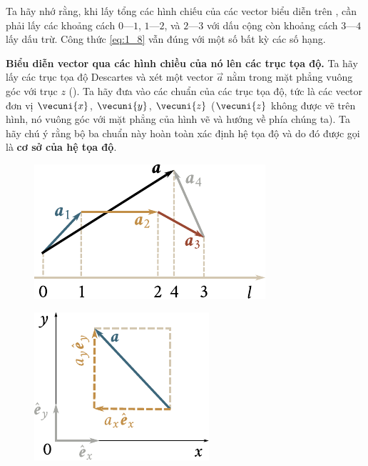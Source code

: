 \noindent
Ta hãy nhớ rằng, khi lấy tổng các hình chiếu của các vector biểu diễn trên , cần phải lấy các khoảng cách $0$---$1$, $1$---$2$, và $2$---$3$ với dấu cộng còn khoảng cách $3$---$4$ lấy dấu trừ. Công thức \eqref{eq:1_8} vẫn đúng với một số bất kỳ các số hạng.

\textbf{Biểu diễn vector qua các hình chiều của nó lên các trục tọa độ.} Ta hãy lấy các trục tọa độ Descartes và xét một vector $\vec{a}$ nằm trong mặt phẳng vuông góc với trục $z$ (). Ta hãy đưa vào các chuẩn của các trục tọa độ, tức là các vector đơn vị $\vecuni{x}$, $\vecuni{y}$, $\vecuni{z}$ ($\vecuni{z}$ không được vẽ trên hình, nó vuông góc với mặt phẳng của hình vẽ và hướng về phía chúng ta). Ta hãy chú ý rằng bộ ba chuẩn này hoàn toàn xác định hệ tọa độ và do đó được gọi là \textbf{cơ sở của hệ tọa độ}.

\begin{figure}[!htb]
	\begin{minipage}[t]{0.5\linewidth}
		\begin{center}
			\includegraphics[scale=1]{figures/ch_01/fig_1_11.pdf}
			\caption[]{}
			\label{fig:1_11}
		\end{center}
	\end{minipage}
	\hfill{ }%
	\begin{minipage}[t]{0.5\linewidth}
		\begin{center}
			\includegraphics[scale=0.95]{figures/ch_01/fig_1_12.pdf}
			\caption[]{}
			\label{fig:1_12}
		\end{center}
	\end{minipage}
\end{figure}

